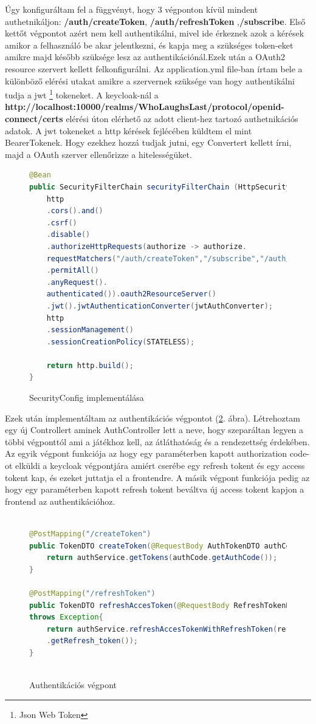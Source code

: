 \documentclass[a4paper,twoside]{article}
\begin{document}
Úgy konfiguráltam fel a függvényt, hogy 3 végponton kívül mindent authetnikáljon: \textbf{/auth/createToken}, \textbf{/auth/refreshToken} ,\textbf{/subscribe}. Első kettőt végpontot azért nem kell authentikálni, mivel ide érkeznek azok a kérések amikor a felhasználó be akar jelentkezni, és kapja meg a szükséges token-eket amikre majd később szüksége lesz az authentikációnál.Ezek után a OAuth2 resource szervert kellett felkonfigurálni. Az application.yml file-ban írtam bele a különböző elérési utakat amikre a szervernek szüksége van hogy authentikálni tudja a jwt \footnote{Json Web Token} tokeneket. A keycloak-nál a \textbf{http://localhost:10000/realms/WhoLaughsLast/protocol/openid-connect/certs} elérési úton 
elérhető az adott client-hez tartozó authetnikációs adatok. A jwt tokeneket a http kérések fejlécében küldtem el mint BearerTokenek. Hogy ezekhez hozzá tudjak jutni,
egy Convertert kellett írni, majd a OAuth szerver ellenőrizze a hitelességüket. 

\begin{figure}
	\caption{SecurityConfig implementálása}
	\centering
\begin{lstlisting}[language=java]
@Bean
public SecurityFilterChain securityFilterChain (HttpSecurity http) throws Exception{
	http
	.cors().and()
	.csrf()
	.disable()
	.authorizeHttpRequests(authorize -> authorize.
	requestMatchers("/auth/createToken","/subscribe","/auth/refreshToken")
	.permitAll()
	.anyRequest().
	authenticated()).oauth2ResourceServer()
	.jwt().jwtAuthenticationConverter(jwtAuthConverter);
	http
	.sessionManagement()
	.sessionCreationPolicy(STATELESS);
	
	return http.build();
}
\end{lstlisting}
\label{secConf}
\end{figure}
\newpage

Ezek után implementáltam az authentikációs végpontot (\ref{authEndpoint}. ábra). Létrehoztam egy új Controllert aminek AuthController lett a neve,
hogy szeparáltan legyen a többi végponttól ami a játékhoz kell, az átláthatóság és a rendezettség érdekében. Az egyik végpont 
funkciója az hogy egy paraméterben kapott authorization code-ot elküldi a keycloak végpontjára amiért cserébe egy refresh tokent és egy access tokent kap,
és ezeket juttatja el a frontendre. A másik végpont funkciója pedig az hogy egy paraméterben kapott refresh tokent beváltva új access tokent kapjon a frontend az authentikációhoz. 

\begin{figure}[h]
	\caption{Authentikációs végpont}
	\centering
	\begin{lstlisting}[language=java]
		
@PostMapping("/createToken")
public TokenDTO createToken(@RequestBody AuthTokenDTO authCode) throws Exception{
	return authService.getTokens(authCode.getAuthCode());
}		

@PostMapping("/refreshToken")
public TokenDTO refreshAccesToken(@RequestBody RefreshTokenDTO refreshTokenDTO)
throws Exception{
	return authService.refreshAccesTokenWithRefreshToken(refreshTokenDTO
	.getRefresh_token());
}
		
	\end{lstlisting}
	\label{authEndpoint}
\end{figure} 
\end{document}
